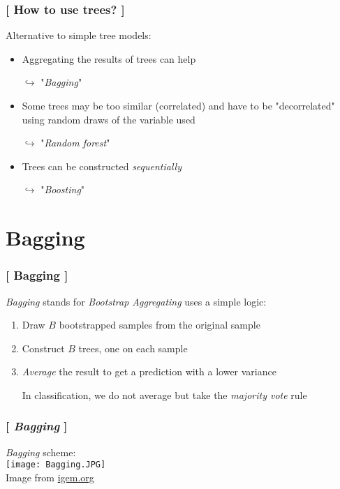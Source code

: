 \documentclass[xcolor=x11names,compress, aspectratio=169]{beamer}
\renewcommand{\(}{\begin{columns}}
\renewcommand{\)}{\end{columns}}
\newcommand{\<}[1]{\begin{column}{#1}}
\renewcommand{\>}{\end{column}}
\begin{document}
\begin{frame}
\frametitle{\textcolor{brique}{[ How to use trees? ]}}
Alternative to simple tree models:
\pause
\begin{itemize}[<+->]
    \item Aggregating the results of trees can help
    \item[$\hookrightarrow$]  "\emph{Bagging}"
    \item Some trees may be too similar (correlated) and have to be "decorrelated" using random draws of the variable used
    \item[$\hookrightarrow$]  "\emph{Random forest}"
    \item Trees can be constructed \textit{sequentially}
    \item[$\hookrightarrow$] "\emph{Boosting}"
\end{itemize}
\end{frame}



\section{Bagging}


\begin{frame}
\frametitle{\textcolor{brique}{[ Bagging ]}}
\textit{Bagging} stands for \textit{Bootstrap Aggregating} uses a simple logic:
\pause
\begin{enumerate}[<+->]
    \item Draw $B$ bootstrapped samples from the original sample
    \item Construct $B$ trees, one on each sample
    \item  \textit{Average} the result to get a prediction  with a lower variance
    \item[]
    \item[]In classification, we do not average but take the \emph{majority vote} rule
\end{enumerate}
\end{frame}

\begin{frame}
\frametitle{\textcolor{brique}{[ \textit{Bagging} ]}}
\textit{Bagging} scheme:\\
\texttt{[image: Bagging.JPG]}\\
\vfill
\textcolor{gris}{\small Image from \href{http://2018.igem.org/Team:Jilin_China/Model/Screening_System}{igem.org}}
\end{frame}
\end{document}
